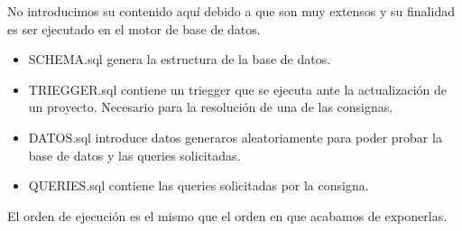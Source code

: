 \documentclass[10pt, a4paper]{article}
\begin{document}
No introducimos su contenido aqu\'i debido a que son muy extensos y su finalidad es ser ejecutado en el motor de base de datos. 

\begin{itemize}
	\item SCHEMA.sql genera la estructura de la base de datos.
	\item TRIEGGER.sql contiene un triegger que se ejecuta ante la actualizaci\'on de un proyecto. Necesario para la resoluci\'on de una de las consignas.
	\item DATOS.sql introduce datos generaros aleatoriamente para poder probar la base de datos y las queries solicitadas.
	\item QUERIES.sql contiene las queries solicitadas por la consigna.
\end{itemize}
El orden de ejecuci\'on es el mismo que el orden en que acabamos de exponerlas.
\end{document}
